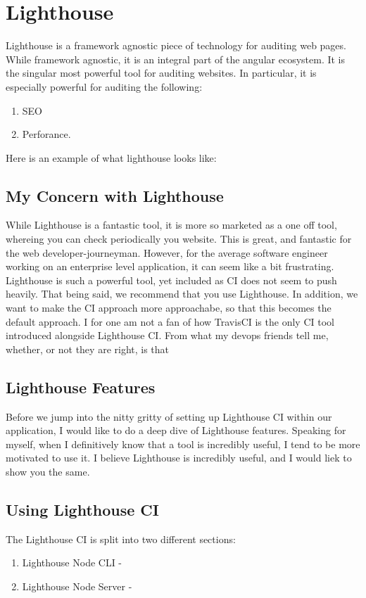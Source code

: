 \chapter{ Lighthouse }    

Lighthouse is a framework agnostic piece of technology for auditing web pages. While framework agnostic, it is an integral part of the angular ecosystem. It is the singular most powerful tool for auditing websites. In particular, it is especially powerful for auditing the following:
\begin{enumerate}
  \item SEO 
  \item Perforance.
\end{enumerate}

Here is an example of what lighthouse looks like: 

\section{My Concern with Lighthouse}
While Lighthouse is a fantastic tool, it is more so marketed as a one off tool, whereing you can check periodically you website. This is great, and fantastic for the web developer-journeyman. However, for the average software engineer working on an enterprise level application, it can seem like a bit frustrating. Lighthouse is such a powerful tool, yet included as CI does not seem to push heavily. That being said, we recommend that you use Lighthouse. In addition, we want to make the CI approach more approachabe, so that this becomes the default approach. I for one am not a fan of how TravisCI is the only CI tool introduced alongside Lighthouse CI. From what my devops friends tell me, whether, or not they are right, is that 

\section{Lighthouse Features}
Before we jump into the nitty gritty of setting up Lighthouse CI within our application, I would like to do a deep dive of Lighthouse features. Speaking for myself, when I definitively know that a tool is incredibly useful, I tend to be more motivated to use it. I believe Lighthouse is incredibly useful, and I would liek to show you the same. 

\section{Using Lighthouse CI}
The Lighthouse CI is split into two different sections: 
\begin{enumerate}
  \item Lighthouse Node CLI - 
  \item Lighthouse Node Server - 
\end{enumerate}

